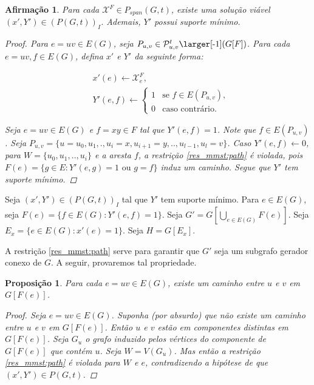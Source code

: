 \documentclass[11pt,reqno]{amsart}
\newcommand{\smallF}{\mbox{\larger[-1]$(G[F])$}}
\newcommand{\spanPath}{\mathcal{P}}
\newcommand{\Pathuv}{\spanPath_{u,v}^{t}}
\newcommand{\PathuvF}{\Pathuv\smallF}
\newtheorem{afirmacao}{Afirmação}[teorema]
\newtheorem{proposicao}{Proposição}
\newcommand{\incid}{\mathcal{X}}
\begin{document}
\begin{afirmacao}
\label{afirm:sol_viavel_lp} 
Para cada $\incid^{F} \in P_{span}(G,t)$, existe uma solução viável 
$(x', Y') \in (P(G,t))_{I}$. Ademais, $Y'$ possui suporte 
mínimo.
\begin{proof}
Para $e=uv \in E(G)$, seja $P_{u,v} \in \PathuvF$. 
Para cada $e = uv, f \in E(G)$, 
defina $x'$ e $Y'$ da seguinte forma: 

\begin{align*}
&x'(e) \leftarrow \incid^{F}_{e},\\
&Y'(e,f)\leftarrow
\begin{cases}
    1& \text{se $f \in E(P_{u,v}),$}\\
    0& \text{caso contrário.}
\end{cases}
\end{align*}

Seja $e = uv \in E(G)$ e $f = xy \in F$ tal que $Y'(e,f) = 1$. Note que 
$f \in E(P_{u,v})$. Seja 
$P_{u,v} = \{u = u_0, u_1, ., u_i = x, u_{i+1} = y, ..,  u_{l-1}, u_l = v\}$. 
Caso $Y'(e,f) \leftarrow 0$, para $W = \{u_0, u_1, .., u_i\}$ e a aresta $f$, 
a restrição \ref{res_mmst:path} é violada, 
pois $F(e) = \{g \in E: Y'(e,g) = 1 \text{ ou } g = f\}$ induz um caminho. 
Segue que $Y'$ tem suporte mínimo.
\end{proof}
\end{afirmacao}

Seja %
$(x',Y') \in (P(G,t))_{I}$ %
tal que $Y'$ tem suporte mínimo. 
Para $e \in E(G)$, seja $F(e) = \{f \in E(G): Y'(e,f) = 1\}$. 
Seja $G' = G[\bigcup_{e \in E(G)}F(e)]$. 
Seja $E_{x} = \{e \in E(G): x'(e) = 1\}$. Seja $H = G[E_{x}]$.

A restrição \ref{res_mmst:path}
serve para garantir que $G'$ seja um subgrafo gerador conexo de $G$. A 
seguir, provaremos tal propriedade.

\begin{proposicao}
\label{prop:Yuv_caminho}
Para cada $e = uv \in E(G)$, existe um caminho entre $u$ e $v$ em 
$G[F(e)]$.
\begin{proof}
Seja $e = uv \in E(G)$. Suponha (por absurdo) que não existe um 
caminho entre $u$ e $v$ em $G[F(e)]$. Então $u$ e $v$ estão 
em componentes distintas em $G[F(e)]$. Seja $G_u$ o grafo induzido pelos 
vértices do componente de $G[F(e)]$ que contém $u$. Seja $W = V(G_u)$. Mas 
então a restrição \ref{res_mmst:path} é violada para $W$ e $e$, 
contradizendo a hipótese de que $(x',Y') \in P(G,t)$. 
\end{proof}
\end{proposicao}
\end{document}

